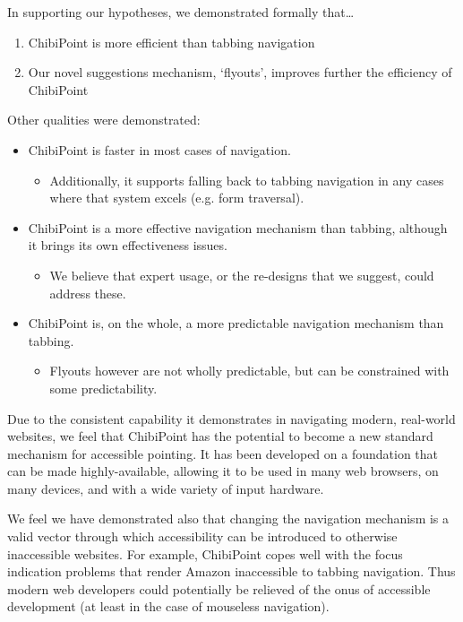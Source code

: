 \documentclass[11pt,openright,a4paper]{report}
\begin{document}
In supporting our hypotheses, we demonstrated formally that\ldots
\begin{enumerate}
	\item ChibiPoint is more efficient than tabbing navigation
	\item Our novel suggestions mechanism, `flyouts', improves further the efficiency of ChibiPoint
\end{enumerate}

Other qualities were demonstrated:

\begin{itemize}
\item ChibiPoint is faster in most cases of navigation.
	\begin{itemize}
	\item Additionally, it supports falling back to tabbing navigation in any cases where that system excels (e.g. form traversal).
	\end{itemize}
\item ChibiPoint is a more effective navigation mechanism than tabbing, although it brings its own effectiveness issues.
	\begin{itemize}
	\item We believe that expert usage, or the re-designs that we suggest, could address these.
	\end{itemize}
\item ChibiPoint is, on the whole, a more predictable navigation mechanism than tabbing.
	\begin{itemize}
	\item Flyouts however are not wholly predictable, but can be constrained with some predictability.
	\end{itemize}
\end{itemize}

Due to the consistent capability it demonstrates in navigating modern, real-world websites, we feel that ChibiPoint has the potential to become a new standard mechanism for accessible pointing. It has been developed on a foundation that can be made highly-available, allowing it to be used in many web browsers, on many devices, and with a wide variety of input hardware.

We feel we have demonstrated also that changing the navigation mechanism is a valid vector through which accessibility can be introduced to otherwise inaccessible websites. For example, ChibiPoint copes well with the focus indication problems that render Amazon inaccessible to tabbing navigation. Thus modern web developers could potentially be relieved of the onus of accessible development (at least in the case of mouseless navigation).
\end{document}
